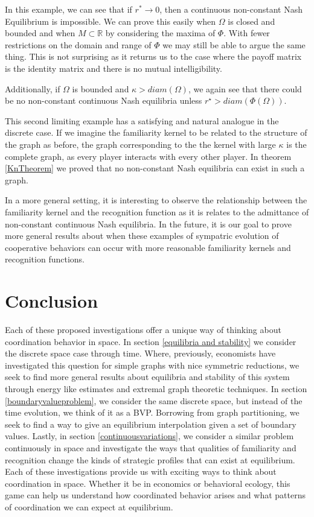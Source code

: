 \documentclass[]{article}
\begin{document}
	
		In this example, we can see that if $r^*\rightarrow0$, then a continuous non-constant Nash Equilibrium is impossible. We can prove this easily when $\Omega$ is closed and bounded and when $M\subset \mathbb{R}$ by considering the maxima of $\Phi$. With fewer restrictions on the domain and range of $\Phi$ we may still be able to argue the same thing. This is not surprising as it returns us to the case where the payoff matrix is the identity matrix and there is no mutual intelligibility.  
		
		Additionally, if $\Omega$ is bounded and $\kappa> diam(\Omega)$, we again see that there could be no non-constant continuous Nash equilibria unless $r^\star>diam(\Phi(\Omega))$.  
		
		This second limiting example has a satisfying and natural analogue in the discrete case. If we imagine the familiarity kernel to be related to the structure of the graph as before, the graph corresponding to the the kernel with large $\kappa$ is the complete graph, as every player interacts with every other player. In theorem \ref{KnTheorem} we proved that no non-constant Nash equilibria can exist in such a graph.
	
		In a more general setting, it is interesting to observe the relationship between the familiarity kernel and the recognition function as it is relates to the admittance of non-constant continuous Nash equilibria. In the future, it is our goal to prove more general results about when these examples of sympatric evolution of cooperative behaviors can occur with more reasonable familiarity kernels and recognition functions. 
	\section*{Conclusion}\label{conclusion} 
	Each of these proposed investigations offer a unique way of thinking about coordination behavior in space. In section \ref{equilibria and stability} we consider the discrete space case through time. Where, previously, economists have investigated this question for simple graphs with nice symmetric reductions, we seek to find more general results about equilibria and stability of this system through energy like estimates and extremal graph theoretic techniques. In section \ref{boundaryvalueproblem}, we consider the same discrete space, but instead of the time evolution, we think of it as a BVP. Borrowing from graph partitioning, we seek to find a way to give an equilibrium interpolation given a set of boundary values. Lastly, in section \ref{continuousvariations}, we consider a similar problem continuously in space and investigate the ways that qualities of familiarity and recognition change the kinds of strategic profiles that can exist at equilibrium. Each of these investigations provide us with exciting ways to think about coordination in space. Whether it be in economics or behavioral ecology, this game can help us understand how coordinated behavior arises and what patterns of coordination we can expect at equilibrium.  
	
	
\end{document}

